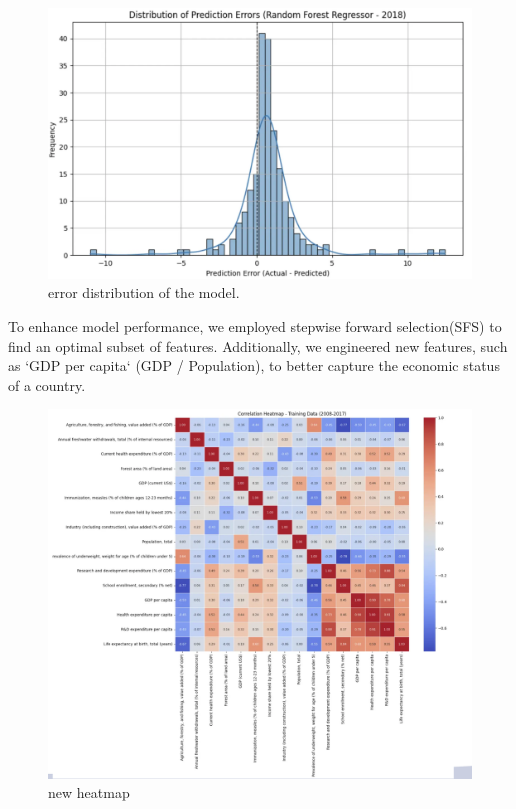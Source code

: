 \documentclass{article}
\begin{document}
\begin{figure}[h]
    \centering
    \includegraphics[width=0.8\columnwidth]{./pic/T1.c.1.png} %
    \caption{error distribution of the model.}
    \label{fig:correlation_heatmapc}
\end{figure}


To enhance model performance, we employed stepwise forward selection(SFS) \cite{Efroymson1960} to find an optimal subset 
of features. Additionally, we engineered new features, such as `GDP per capita` (GDP / Population), 
to better capture the economic status of a country.

\begin{figure}[h]
    \centering
    \includegraphics[width=0.8\columnwidth]{./pic/T1.c.2.png} %
    \caption{new heatmap}
    \label{fig:correlation_heatmap}
\end{figure}
\end{document}
